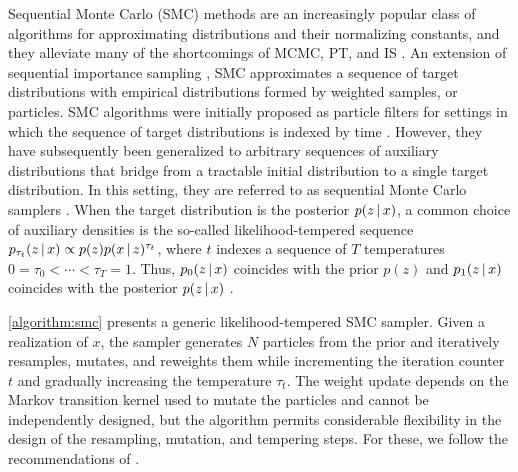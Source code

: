 \documentclass[
  12pt]{article}
\newcommand{\padvert}{\thinspace \vert \thinspace}
\begin{document}
Sequential Monte Carlo (SMC) methods are an increasingly popular class of algorithms for approximating distributions and their normalizing constants, and they alleviate many of the shortcomings of MCMC, PT, and IS \citep{chopin2020}. An extension of sequential importance sampling \citep{naesseth2019elements}, SMC approximates a sequence of target distributions with empirical distributions formed by weighted samples, or particles. SMC algorithms were initially proposed as particle filters for settings in which the sequence of target distributions is indexed by time \citep{gordon1993novel, carpenter1999improved, doucet2001introduction}. However, they have subsequently been generalized to arbitrary sequences of auxiliary distributions that bridge from a tractable initial distribution to a single target distribution. In this setting, they are referred to as sequential Monte Carlo samplers \citep{del2006sequential}. When the target distribution is the posterior $p(z \padvert x)$, a common choice of auxiliary densities is the so-called likelihood-tempered sequence $p_{\tau_t}(z \padvert x) \propto p(z) p(x \padvert z)^{\tau_t}$, where $t$ indexes a sequence of $T$ temperatures $0 = \tau_0 < \cdots < \tau_T = 1$. Thus, $p_0(z \padvert x)$ coincides with the prior $p(z)$ and $p_1(z \padvert x)$ coincides with the posterior $p(z \padvert x)$ \citep{dai2022invitation}.

\autoref{algorithm:smc} presents a generic likelihood-tempered SMC sampler. Given a realization of $x$, the sampler generates $N$ particles from the prior and iteratively resamples, mutates, and reweights them while incrementing the iteration counter $t$ and gradually increasing the temperature $\tau_t$. The weight update depends on the Markov transition kernel used to mutate the particles and cannot be independently designed, but the algorithm permits considerable flexibility in the design of the resampling, mutation, and tempering steps. For these, we follow the recommendations of \cite{chopin2020}.
\end{document}
